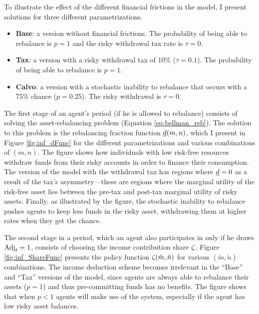\documentclass[./RiskyContrib.tex]{subfiles}
\begin{document}
To illustrate the effect of the different financial frictions in the
model, I present solutions for three different parametrizations.
\begin{itemize}
\item \textbf{Base}: a version without financial frictions. The probability
of being able to rebalance is $p = 1$ and the risky withdrawal tax rate is $\tau = 0$.
\item \textbf{Tax}: a version with a risky withdrawal tax of $10\%$ ($\tau = 0.1$).
The probability of being able to rebalance is $p = 1$.
\item \textbf{Calvo}: a version with a stochastic inability to rebalance that
occurs with a $75\%$ chance ($p = 0.25$). The risky withdrawal is $\tau = 0$.
\end{itemize}



The first stage of an agent's period (if he is allowed to rebalance) consists of
solving the asset-rebalancing problem (Equation \ref{eq:bellman_reb}). The solution
to this problem is the rebalancing fraction function $\underline{d}(m,n)$, which I present
in Figure \ref{fig:inf_dFunc} for the different parametrizations and various
combinations of $(m,n)$. The figure shows how individuals with low risk-free resources
withdraw funds from their risky accounts in order to finance their consumption.
The version of the model with the withdrawal tax has regions where $\underline{d} = 0$ as
a result of the tax's asymmetry---these are regions where the marginal utility of the
risk-free asset lies between the pre-tax and post-tax marginal utility of risky assets.
Finally, as illustrated by the figure, the stochastic inability to rebalance pushes agents to
keep less funds in the risky asset, withdrawing them at higher rates when they get the chance.



The second stage in a period, which an agent also participates in only if
he draws $\text{Adj}_t = 1$, consists of choosing the income contribution share $\zeta$.
Figure \ref{fig:inf_ShareFunc} presents the policy function $\zeta(\tilde{m},\tilde{n})$
for various $(\tilde{m},\tilde{n})$ combinations. The income deduction scheme
becomes irrelevant in the ``Base'' and ``Tax'' versions of the model, since
agents are always able to rebalance their assets ($p=1$) and thus pre-committing
funds has no benefits. The figure shows that when $p<1$ agents will
make use of the system, especially if the agent has low risky asset balances.
\end{document}
